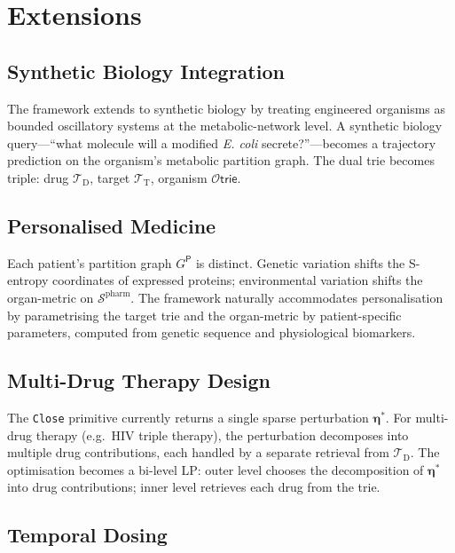 \documentclass[11pt,twocolumn,a4paper]{article}
\theoremstyle{definition}
\theoremstyle{remark}
\newcommand{\Sspace}{\mathcal{S}}
\newcommand{\Trie}{\mathcal{T}}
\newcommand{\Dtrie}{\Trie_{\mathrm{D}}}
\newcommand{\Ttrie}{\Trie_{\mathrm{T}}}
\newcommand{\Patient}{\mathsf{P}}
\begin{document}
\section{Extensions}
\label{sec:extensions}

\subsection{Synthetic Biology Integration}

The framework extends to synthetic biology by treating engineered organisms as bounded oscillatory systems at the metabolic-network level. A synthetic biology query---``what molecule will a modified \emph{E. coli} secrete?''---becomes a trajectory prediction on the organism's metabolic partition graph. The dual trie becomes triple: drug $\Dtrie$, target $\Ttrie$, organism $\mathcal{O}\mathsf{trie}$.

\subsection{Personalised Medicine}

Each patient's partition graph $G^\Patient$ is distinct. Genetic variation shifts the S-entropy coordinates of expressed proteins; environmental variation shifts the organ-metric on $\Sspace^{\mathrm{pharm}}$. The framework naturally accommodates personalisation by parametrising the target trie and the organ-metric by patient-specific parameters, computed from genetic sequence and physiological biomarkers.

\subsection{Multi-Drug Therapy Design}

The \texttt{Close} primitive currently returns a single sparse perturbation $\boldsymbol{\eta}^*$. For multi-drug therapy (e.g.\ HIV triple therapy), the perturbation decomposes into multiple drug contributions, each handled by a separate retrieval from $\Dtrie$. The optimisation becomes a bi-level LP: outer level chooses the decomposition of $\boldsymbol{\eta}^*$ into drug contributions; inner level retrieves each drug from the trie.

\subsection{Temporal Dosing}
\end{document}
